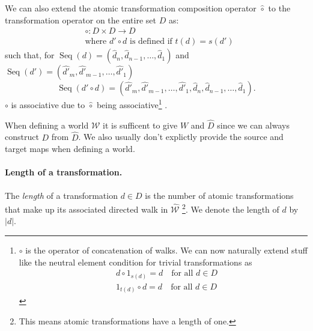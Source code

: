We can also extend the atomic transformation composition operator $\hat{\circ}$ to the transformation operator on the entire set $D$ as:
\begin{equation}
\begin{aligned}
	& \circ: D \times D \to D \\
	& \text{where $d' \circ d$ is defined if $t(d) = s(d')$}
\end{aligned}
\end{equation}
such that, for $\operatorname{Seq}(d) = (\hat{d}_{n}, \hat{d}_{n-1}, \dots, \hat{d}_{1})$ and $\operatorname{Seq}(d') = (\hat{d'}_{m}, \hat{d'}_{m-1}, \dots, \hat{d'}_{1})$
\begin{equation}
	\operatorname{Seq}(d' \circ d) = (\hat{d'}_{m}, \hat{d'}_{m-1}, \dots, \hat{d'}_{1}, \hat{d}_{n}, \hat{d}_{n-1}, \dots, \hat{d}_{1}).
\end{equation}
$\circ$ is associative due to $\hat{\circ}$ being associative\footnote{
$\circ$ is the operator of concatenation of walks.
	We can now naturally extend stuff like the neutral element condition for trivial transformations as
	\begin{align}
		& d \circ 1_{s(d)} = d \quad \text{for all $d \in D$} \\
		& 1_{t(d)} \circ d = d \quad \text{for all $d \in D$}
	\end{align}
}
.

\begin{definition}
	When defining a world $\mathscr{W}$ it is sufficent to give $W$ and $\hat{D}$ since we can always construct $D$ from $\hat{D}$.
	We also usually don't explictly provide the source and target maps when defining a world.
\end{definition}



\paragraph{Length of a transformation.}
The \emph{length} of a transformation $d \in D$ is the number of atomic transformations that make up its associated directed walk in $\hat{\mathscr{W}}$ \footnote{
	This means atomic transformations have a length of one.
}.
We denote the length of $d$ by $|d|$.





